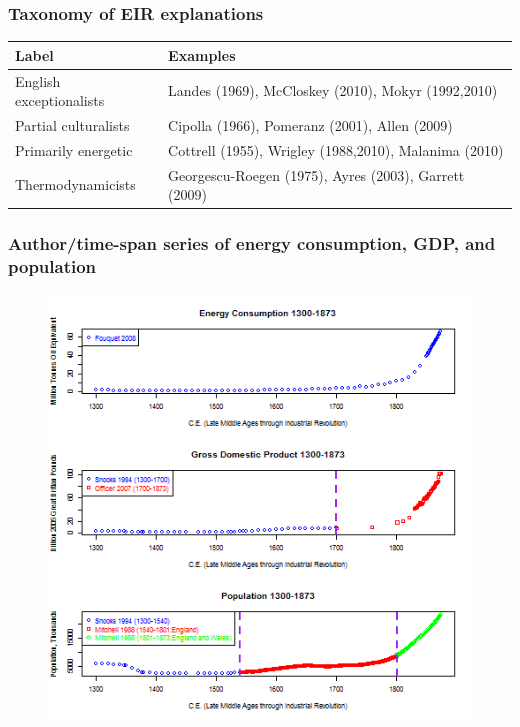 \documentclass[final]{beamer}
\begin{document}
\begin{frame}
\frametitle{Taxonomy of EIR explanations}
\footnotesize{
\begin{table}[p!]
\label{tbl:taxonomy}
\begin{tabular}{ll}
Label&Examples\\
\hline \hline
English exceptionalists&Landes (1969), McCloskey (2010), Mokyr (1992,2010)\\
Partial culturalists&Cipolla (1966), Pomeranz (2001), Allen (2009)\\
Primarily energetic&Cottrell (1955), Wrigley (1988,2010), Malanima (2010)\\
Thermodynamicists&Georgescu-Roegen (1975), Ayres (2003), Garrett (2009)\\
\end{tabular}
\end{table}
}
\end{frame}

\begin{frame}
\frametitle{Author/time-span series of energy consumption, GDP, and population}
\begin{figure}[p!]
\center
\label{fig:overall levels}
\includegraphics[height=0.8\textheight]{overallLevels}
\end{figure}
\end{frame}
\end{document}
